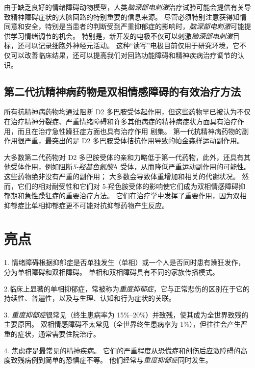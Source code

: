 由于缺乏良好的情绪障碍动物模型，人类\textit{脑深部电刺激}治疗试验可能会提供有关导致精神障碍症状的大脑回路的特别重要的信息来源。
尽管必须特别注意获得知情同意和安全，特别是当患者的判断受到严重抑郁症的影响时，\textit{脑深部电刺激}可能提供学习情绪调节的机会。
特别是，新开发的电极不仅可以刺激\textit{脑深部电刺激}目标，还可以记录细胞外神经元活动。
这种“读写”电极目前仅用于研究环境，它不仅可以改善临床结果，还可以提高我们对回路功能障碍和精神疾病治疗调节的认识。



\subsection{第二代抗精神病药物是双相情感障碍的有效治疗方法}

所有抗精神病药物均通过阻断 D2 多巴胺受体起作用，但这些药物早已被认为不仅在治疗精神分裂症、严重情绪障碍和许多其他病症的精神病症状方面具有治疗作用，而且在治疗急性躁狂症方面也具有治疗作用 剧集。
第一代抗精神病药物的副作用很严重，最突出的是 D2 多巴胺受体拮抗作用导致的帕金森样运动副作用。


大多数第二代药物对 D2 多巴胺受体的亲和力略低于第一代药物，此外，还具有其他受体作用，例如阻断\textit{5-羟基色氨酸}A 受体，从而降低严重运动副作用的可能性。
这些药物绝非没有严重的副作用；
大多数会导致体重增加和相关的代谢状况。
然而，它们的相对耐受性和它们对 5-羟色胺受体的影响使它们成为双相情感障碍抑郁期和急性躁狂症的重要治疗方法。
它们在治疗学中发挥了重要作用，因为双相抑郁症比单相抑郁症更不可能对抗抑郁药物产生反应。



\section{亮点}

1. 情绪障碍根据抑郁症是否单独发生（单相）或一个人是否同时患有躁狂发作，分为单相障碍和双相障碍。
单相和双相障碍具有不同的家族传播模式。 


2.临床上显著的单相抑郁症，常被称为\textit{重度抑郁症}，它与正常悲伤的区别在于它的持续性、普遍性，以及与生理、认知和行为症状的关联。


3. \textit{重度抑郁症}很常见（终生患病率为 15\%–20\%）并致残，使其成为全世界致残的主要原因。
双相情感障碍不太常见（全世界终生患病率为 1\%），但往往会产生严重的症状，通常需要住院治疗。 


4. 焦虑症是最常见的精神疾病。
它们的严重程度从恐慌症和创伤后应激障碍的高度致残病例到简单的恐惧症不等。
他们经常与\textit{重度抑郁症}同时发生。


